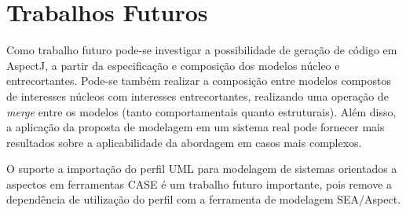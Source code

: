 \section{Trabalhos Futuros}

Como trabalho futuro pode-se investigar a possibilidade de geração de código em AspectJ, a partir da especificação e composição dos modelos núcleo e
entrecortantes. Pode-se também realizar a composição entre modelos compostos de interesses núcleos com interesses entrecortantes, realizando uma
operação de \textit{merge} entre os modelos (tanto comportamentais quanto estruturais). Além disso, a aplicação da proposta de modelagem em um sistema
real pode fornecer mais resultados sobre a aplicabilidade da abordagem em casos mais complexos.

O suporte a importação do perfil UML para modelagem de sistemas orientados a aspectos em ferramentas CASE é um trabalho futuro importante,
pois remove a dependência de utilização do perfil com a ferramenta de modelagem SEA/Aspect.

